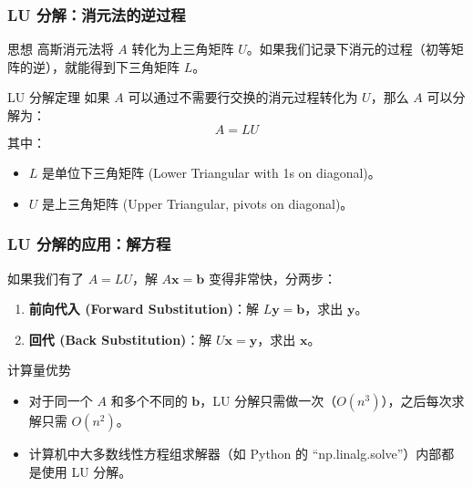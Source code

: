 \begin{frame}
\frametitle{LU 分解：消元法的逆过程}

\begin{block}{思想}
高斯消元法将 $A$ 转化为上三角矩阵 $U$。如果我们记录下消元的过程（初等矩阵的逆），就能得到下三角矩阵 $L$。
\end{block}

\begin{block}{LU 分解定理}
如果 $A$ 可以通过不需要行交换的消元过程转化为 $U$，那么 $A$ 可以分解为：
\[
A = L U
\]
其中：
\begin{itemize}
    \item $L$ 是单位下三角矩阵 (Lower Triangular with 1s on diagonal)。
    \item $U$ 是上三角矩阵 (Upper Triangular, pivots on diagonal)。
\end{itemize}
\end{block}

\end{frame}


\begin{frame}
\frametitle{LU 分解的应用：解方程}

如果我们有了 $A = LU$，解 $A\mathbf{x} = \mathbf{b}$ 变得非常快，分两步：

\begin{enumerate}
    \item \textbf{前向代入 (Forward Substitution)}：解 $L\mathbf{y} = \mathbf{b}$，求出 $\mathbf{y}$。
    \item \textbf{回代 (Back Substitution)}：解 $U\mathbf{x} = \mathbf{y}$，求出 $\mathbf{x}$。
\end{enumerate}

\begin{block}{计算量优势}
\begin{itemize}
    \item 对于同一个 $A$ 和多个不同的 $\mathbf{b}$，LU 分解只需做一次（$O(n^3)$），之后每次求解只需 $O(n^2)$。
    \item 计算机中大多数线性方程组求解器（如 Python 的 ``np.linalg.solve''）内部都是使用 LU 分解。
\end{itemize}
\end{block}

\end{frame}


